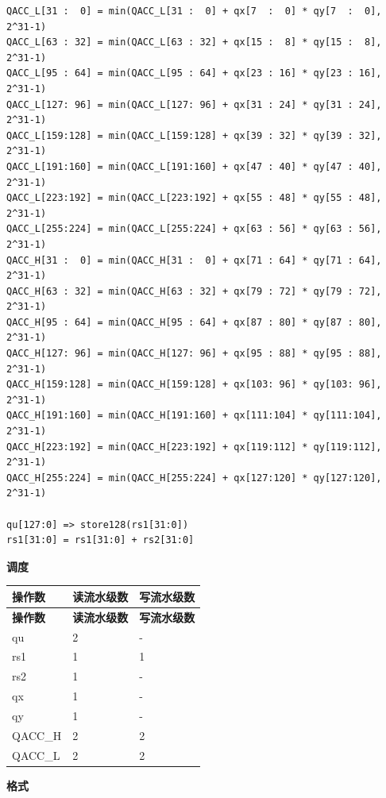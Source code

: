 \begin{lstlisting}
QACC_L[31 :  0] = min(QACC_L[31 :  0] + qx[7  :  0] * qy[7  :  0], 2^31-1)
QACC_L[63 : 32] = min(QACC_L[63 : 32] + qx[15 :  8] * qy[15 :  8], 2^31-1)
QACC_L[95 : 64] = min(QACC_L[95 : 64] + qx[23 : 16] * qy[23 : 16], 2^31-1)
QACC_L[127: 96] = min(QACC_L[127: 96] + qx[31 : 24] * qy[31 : 24], 2^31-1)
QACC_L[159:128] = min(QACC_L[159:128] + qx[39 : 32] * qy[39 : 32], 2^31-1)
QACC_L[191:160] = min(QACC_L[191:160] + qx[47 : 40] * qy[47 : 40], 2^31-1)
QACC_L[223:192] = min(QACC_L[223:192] + qx[55 : 48] * qy[55 : 48], 2^31-1)
QACC_L[255:224] = min(QACC_L[255:224] + qx[63 : 56] * qy[63 : 56], 2^31-1)
QACC_H[31 :  0] = min(QACC_H[31 :  0] + qx[71 : 64] * qy[71 : 64], 2^31-1)
QACC_H[63 : 32] = min(QACC_H[63 : 32] + qx[79 : 72] * qy[79 : 72], 2^31-1)
QACC_H[95 : 64] = min(QACC_H[95 : 64] + qx[87 : 80] * qy[87 : 80], 2^31-1)
QACC_H[127: 96] = min(QACC_H[127: 96] + qx[95 : 88] * qy[95 : 88], 2^31-1)
QACC_H[159:128] = min(QACC_H[159:128] + qx[103: 96] * qy[103: 96], 2^31-1)
QACC_H[191:160] = min(QACC_H[191:160] + qx[111:104] * qy[111:104], 2^31-1)
QACC_H[223:192] = min(QACC_H[223:192] + qx[119:112] * qy[119:112], 2^31-1)
QACC_H[255:224] = min(QACC_H[255:224] + qx[127:120] * qy[127:120], 2^31-1)

qu[127:0] => store128(rs1[31:0])
rs1[31:0] = rs1[31:0] + rs2[31:0]
\end{lstlisting}

\textbf{调度}\\
\begin{longtable}[c]{|l|l|l|}
    \hline
    \rowcolor{lightgray}
    \textbf{操作数} & \textbf{读流水级数} & \textbf{写流水级数} \\\hline
    \endfirsthead
    \hline
    \rowcolor{lightgray}
     \textbf{操作数} & \textbf{读流水级数} & \textbf{写流水级数} \\\hline
    \endhead
    \hline
    \endfoot

    qu & 2 & - \\\hline
    rs1 & 1 & 1 \\\hline
    rs2 & 1 & - \\\hline
     qx & 1 & - \\\hline
     qy & 1 & - \\\hline
     QACC\_H & 2 & 2 \\\hline
     QACC\_L & 2 & 2

\end{longtable}

\textbf{格式}\\

